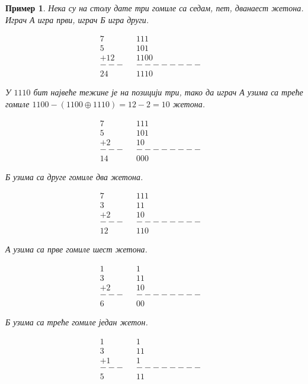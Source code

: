 \documentclass[a4paper]{article}
\newtheorem{example}{Пример}
\begin{document}
\begin{example} 
	Нека су на столу дате три гомиле са седам, пет, дванаест жетона. Играч \textit{А} игра први, играч \textit{Б} игра други.
	
	\begin{align*}
		7&		&   1 1 1&\\
		5&		&   1 0 1&\\
		+12&	& 1 1 0 0&\\
		---&	&--------&\\
		24&		& 1 1 1 0
	\end{align*}
		
	У $ 1 1 1 0 $ бит највеће тежине је на позицији три, тако да играч \textit{А} узима са треће гомиле $ 1 1 0 0 - (1 1 0 0 \oplus  1 1 1 0) = 12 - 2 = 10 $  жетона.	
	
	\begin{align*}
		7&		&  	1 1 1&\\
		5&		&   1 0 1&\\
		+2&		&  	  1 0&\\
		---&	&--------&\\
		14&		&   0 0 0
	\end{align*}
	
	\textit{Б} узима  са друге гомиле два жетона.
	
	\begin{align*}
		7&		&   1 1 1&\\
		3&		&     1 1&\\
		+2&		&  	  1 0&\\
		---&	&--------&\\
		12&		&   1 1 0
	\end{align*}
	
	\textit{А} узима са прве гомиле шест жетона.
	
	\begin{align*}
		1&		&       1&\\
		3&		&     1 1&\\
		+2&		&  	  1 0&\\
		---&	&--------&\\
		6&		&     0 0
	\end{align*}
	
	\textit{Б} узима са треће гомиле један жетон.
	
	\begin{align*}
		1&		&       1&\\
		3&		&     1 1&\\
		+1&		&  	  	1&\\
		---&	&--------&\\
		5&		&     1 1
	\end{align*}
	

\end{example}
\end{document}
